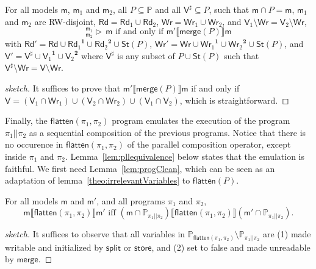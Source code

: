 \documentclass{llncs}
\newcommand{\progStore}{\mathsf{store}}
\newcommand{\progsplit}{\mathsf{split}}
\newcommand{\progmerge}{\mathsf{merge}}
\newcommand{\progFlatten}{\mathsf{flatten}}
\newcommand{\cp}[2]{{#2}^\mathbf{#1}}
\newcommand{\modl}{\mathsf m}
\newcommand{\mrg}[3]{ ^{#2}_{#3} \triangleright \, #1 }
\newcommand{\pll}{ {||} }							%
\newcommand{\readset}{\mathsf{Rd}}
\newcommand{\valuset}{\mathsf{V}}
\newcommand{\writeset}{\mathsf{Wr}}
\newcommand{\storeset}{\mathsf{St}}
\newcommand{\intPgm}[1]{\llbracket #1 \rrbracket}
\newcommand{\propset}{\mathbb P}
\newcommand{\propsetOf}[1]{\propset_{#1}}
\newcommand{\modinter}{\cap}
\begin{document}
\begin{lemma}\label{lem:progmerge}
For all models $\modl$, $\modl_1$ and $\modl_2$, all $P \subseteq \propset$ and all $\valuset^\sharp \subseteq P$,
such that $\modl \modinter P = \modl$,
        $\modl_1$ and $\modl_2$ are RW-disjoint,
        $\readset = \readset_1 \cup \readset_2$,
        $\writeset = \writeset_1 \cup \writeset_2$, and
        $\valuset_1 \setminus \writeset = \valuset_2 \setminus \writeset$,
$$\mrg \modl {\modl_1} {\modl_2} \text{ if and only if }
\modl' \intPgm{\progmerge(P)} \modl$$ with
$\readset' = \readset \cup \cp 1 {\readset_1} \cup \cp 2 {\readset_2} \cup \storeset(P)$,
$\writeset' = \writeset \cup \cp 1 {\writeset_1} \cup \cp 2 {\writeset_2} \cup \storeset(P)$, and
$\valuset' = \valuset^\sharp \cup \cp 1 {\valuset_1} \cup \cp 2 {\valuset_2}$
where $\valuset^\sharp$ is any subset of $P \cup \storeset(P)$ such that
$\valuset^\sharp \setminus \writeset = \valuset \setminus \writeset$.
\end{lemma}
\begin{proof}[sketch]
It suffices to prove that
$\modl' \intPgm{\progmerge(P)} \modl$ if and only if
$\valuset = (\valuset_1 \cap \writeset_1) \cup (\valuset_2 \cap \writeset_2) \cup (\valuset_1 \cap \valuset_2) $,
which is straightforward.
\end{proof}

Finally, the $\progFlatten(\pi_1, \pi_2)$ program emulates the execution of the program $\pi_1 \pll \pi_2$ as
a sequential composition of the previous programs.
Notice that there is no occurence in $\progFlatten(\pi_1, \pi_2)$ of the parallel composition operator,
except inside $\pi_1$ and $\pi_2$.
Lemma~\ref{lem:pllequivalence} below states that the emulation is faithful.
We first need Lemma~\ref{lem:progClean},
which can be seen as an adaptation of lemma~\ref{theo:irrelevantVariables} to $\progFlatten(P)$.

\begin{lemma}\label{lem:progClean}
For all models $\modl$ and $\modl'$, and all programs $\pi_1$ and $\pi_2$,
$$
\modl \intPgm{\progFlatten(\pi_1,\pi_2)} \modl' \text{ iff }
(\modl \modinter \propsetOf{\pi_1 \pll \pi_2}) \intPgm{\progFlatten(\pi_1, \pi_2)} (\modl' \modinter \propsetOf{\pi_1 \pll \pi_2}).
$$
\end{lemma}
\begin{proof}[sketch]
It suffices to observe that all variables in $\propsetOf{\progFlatten(\pi_1, \pi_2)} \setminus \propsetOf{\pi_1 \pll \pi_2}$ are 
(1) made writable and initialized by $\progsplit$ or $\progStore$, and 
(2) set to false and made unreadable by $\progmerge$.
\end{proof}
\end{document}

